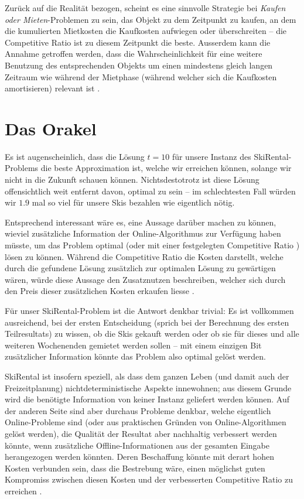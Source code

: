 \documentclass[11pt]{scrreprt} %
\theoremstyle{definition}
\begin{document}
\bigskip
Zurück auf die Realität bezogen, scheint es eine sinnvolle Strategie bei {\sl Kaufen oder Mieten}-Problemen zu sein, das Objekt zu dem Zeitpunkt zu kaufen, an dem die kumulierten Mietkosten die Kaufkosten aufwiegen oder überschreiten -- die Competitive Ratio ist zu diesem Zeitpunkt die beste. Ausserdem kann die Annahme getroffen werden, dass die Wahrscheinlichkeit für eine weitere Benutzung des entsprechenden Objekts um einen mindestens gleich langen Zeitraum wie während der Mietphase (während welcher sich die Kaufkosten amortisieren) relevant ist \cite{Trevisan}.


\section{Das Orakel}

Es ist augenscheinlich, dass die Lösung $t = 10$ für unsere Instanz des {\sc SkiRental}-Problems die beste Approximation ist, welche wir erreichen können, solange wir nicht in die Zukunft schauen können. Nichtsdestotrotz ist diese Lösung offensichtlich weit entfernt davon, optimal zu sein -- im schlechtesten Fall würden wir $1.9$ mal so viel für unsere Skis bezahlen wie eigentlich nötig.

\bigskip
Entsprechend interessant wäre es, eine Aussage darüber machen zu können, wieviel zusätzliche Information der Online-Algorithmus zur Verfügung haben müsste, um das Problem optimal (oder mit einer festgelegten Competitive Ratio \cite{BKK}) lösen zu können. Während die Competitive Ratio die Kosten darstellt, welche durch die gefundene Lösung zusätzlich zur optimalen Lösung zu gewärtigen wären, würde diese Aussage den Zusatznutzen beschreiben, welcher sich durch den Preis dieser zusätzlichen Kosten erkaufen liesse \cite{Dobrev}.

\bigskip
Für unser {\sc SkiRental}-Problem ist die Antwort denkbar trivial: Es ist vollkommen ausreichend, bei der ersten Entscheidung (sprich bei der Berechnung des ersten Teilresultats) zu wissen, ob die Skis gekauft werden  oder ob sie für dieses und alle weiteren Wochenenden gemietet werden sollen -- mit einem einzigen Bit zusätzlicher Information könnte das Problem also optimal gelöst werden.

\bigskip
{\sc SkiRental} ist insofern speziell, als dass dem ganzen Leben (und damit auch der Freizeitplanung) nichtdeterministische Aspekte innewohnen; aus diesem Grunde wird die benötigte Information von keiner Instanz geliefert werden können. Auf der anderen Seite sind aber durchaus Probleme denkbar, welche eigentlich Online-Probleme sind (oder aus praktischen Gründen von Online-Algorithmen gelöst werden), die Qualität der Resultat aber nachhaltig verbessert werden könnte, wenn zusätzliche Offline-Informationen aus der gesamten Eingabe herangezogen werden könnten. Deren Beschaffung könnte mit derart hohen Kosten verbunden sein, dass die Bestrebung wäre, einen möglichst guten Kompromiss zwischen diesen Kosten und der verbesserten Competitive Ratio zu erreichen \cite{Dobrev}.
\end{document}
